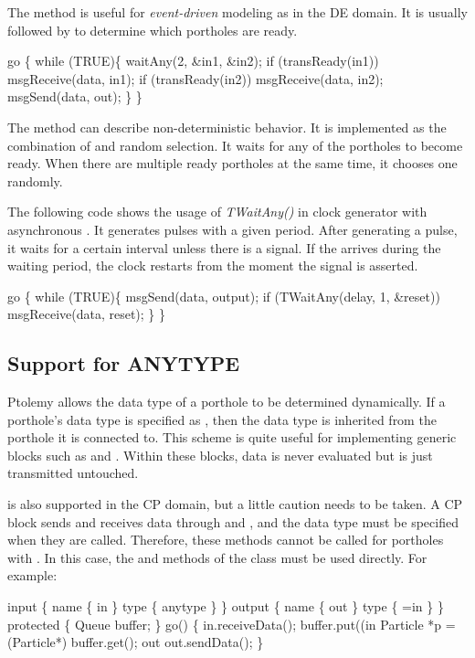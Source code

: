 The  method is useful for \emph{event-driven} modeling as in the
DE domain.  It is usually followed by  to
determine which portholes are ready.

\begin{example}
go \{
    while (TRUE)\{
        waitAny(2, \&in1, \&in2);
        if (transReady(in1)) msgReceive(data, in1);
        if (transReady(in2)) msgReceive(data, in2);
        msgSend(data, out);
    \}
\}
\end{example}

The  method can describe non-deterministic behavior.  It
is implemented as the combination of  and random
selection.  It waits for any of the portholes to become ready.  When
there are multiple ready portholes at the same time, it chooses one
randomly.

The following code shows the usage of \emph{TWaitAny()} in clock generator with 
asynchronous .  It generates pulses with a given period.  After
generating a pulse, it waits for a certain interval unless there is a
 signal.  If the  arrives during the waiting period,
the clock restarts from the moment the  signal is asserted.  

\begin{example}
go \{
    while (TRUE)\{
        msgSend(data, output);
        if (TWaitAny(delay, 1, \&reset)) msgReceive(data, reset);
    \}
\}
\end{example}

\subsection{Support for ANYTYPE}

Ptolemy allows the data type of a porthole to be determined
dynamically.  If a porthole's data type is specified as
, then the data type is inherited from the porthole it is
connected to.  This scheme is quite useful for implementing generic
blocks such as   and .  Within these
blocks, data is never evaluated but is just transmitted untouched.

 is also supported in the CP domain, but a little caution
needs to be taken.  A CP block sends and receives data through
 and , and the data type must be
specified when they are called.  Therefore, these methods cannot be called for
portholes with .  In this case, the  and
 methods of the  class must be
used directly.  For example:

\begin{example}
input \{
    name \{ in \}
    type \{ anytype \}
\}
output \{
    name \{ out \}
    type \{ =in \}
\}
protected \{
    Queue buffer;
\}
go() \{
    in.receiveData();
    buffer.put((in%
    Particle *p = (Particle*) buffer.get();
    out%
    out.sendData();
\}
\end{example}
